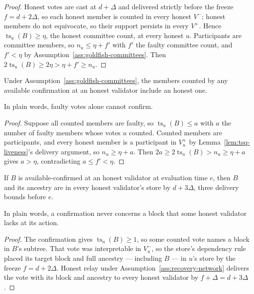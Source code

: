 \begin{proof}
Honest votes are cast at \(d+\Delta\) and delivered strictly before the
freeze \(f=d+2\Delta\), so each honest member is counted in every honest
\(V^-\); honest members do not equivocate, so their support persists in
every \(V^+\).  Hence \(\operatorname{ts}_u(B)\geq\eta\), the honest committee count, at
every honest \(u\).  Participants are committee members, so
\(n_u\leq\eta+f'\) with \(f'\) the faulty committee count, and
\(f'<\eta\) by Assumption~\ref{ass:goldfish-committees}.  Then
\(2\operatorname{ts}_u(B)\geq2\eta>\eta+f'\geq n_u\).
\end{proof}

\begin{corollary}
\label{cor:tsq-honest-witness}
Under Assumption~\ref{ass:goldfish-committees}, the members counted by any
available confirmation at an honest validator include an honest one.

In plain words, faulty votes alone cannot confirm.
\end{corollary}

\begin{proof}
Suppose all counted members are faulty, so \(\operatorname{ts}_u(B)\leq a\) with \(a\) the
number of faulty members whose votes \(u\) counted.  Counted members are
participants, and every honest member is a participant in \(V_u^+\) by
Lemma~\ref{lem:tsq-liveness}'s delivery argument, so
\(n_u\geq\eta+a\).  Then \(2a\geq2\operatorname{ts}_u(B)>n_u\geq\eta+a\) gives \(a>\eta\),
contradicting \(a\leq f'<\eta\).
\end{proof}

\begin{lemma}
\label{lem:tsq-common-knowledge}
If \(B\) is available-confirmed at an honest validator at evaluation time
\(e\), then \(B\) and its ancestry are in every honest validator's store by
\(d+3\Delta\), three delivery bounds before \(e\).

In plain words, a confirmation never concerns a block that some honest
validator lacks at its action.
\end{lemma}

\begin{proof}
The confirmation gives \(\operatorname{ts}_u(B)\geq1\), so some counted vote names a block
in \(B\)'s subtree.  That vote was interpretable in \(V_u^-\), so the
store's dependency rule placed its target block and full ancestry ---
including \(B\) --- in \(u\)'s store by the freeze \(f=d+2\Delta\).
Honest relay under Assumption~\ref{ass:recovery-network} delivers the vote
with its block and ancestry to every honest validator by
\(f+\Delta=d+3\Delta\).
\end{proof}

